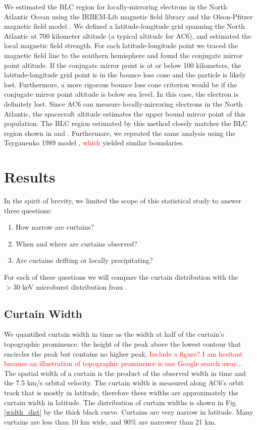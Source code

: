 \documentclass[draft]{agujournal2019}
\begin{document}
We estimated the BLC region for locally-mirroring electrons in the North Atlantic Ocean using the IRBEM-Lib magnetic field library and the Olson-Pfitzer magnetic field model \cite{irbem, Olson1982}. We defined a latitude-longitude grid spanning the North Atlantic at 700 kilometer altitude (a typical altitude for AC6), and estimated the local magnetic field strength. For each latitude-longitude point we traced the magnetic field line to the southern hemisphere and found the conjugate mirror point altitude. If the conjugate mirror point is at or below 100 kilometers, the latitude-longitude grid point is in the bounce loss cone and the particle is likely lost. Furthermore, a more rigorous bounce loss cone criterion would be if the conjugate mirror point altitude is below sea level. In this case, the electron is definitely lost. Since AC6 can measure locally-mirroring electrons in the North Atlantic, the spacecraft altitude estimates the upper bound mirror point of this population. The BLC region estimated by this method closely matches the BLC region shown in  and . Furthermore, we repeated the same analysis using the Tsyganenko 1989 model \cite{Tsyganenko1989}, \textcolor{red}{which} yielded similar boundaries.

\section{Results} \label{results}
In the spirit of brevity, we limited the scope of this statistical study to answer three questions:

\begin{enumerate}
\item How narrow are curtains?
\item When and where are curtains observed?
\item Are curtains drifting or locally precipitating?
\end{enumerate} For each of these questions we will compare the curtain distribution with the $>30$ keV microburst distribution from .

\subsection{Curtain Width}
We quantified curtain width in time as the width at half of the curtain's topographic prominence: the height of the peak above the lowest contour that encircles the peak but contains no higher peak. \textcolor{red}{Include a figure? I am hesitant because an illustration of topographic prominence is one Google search away...} The spatial width of a curtain is the product of the observed width in time and the 7.5 km/s orbital velocity. The curtain width is measured along AC6's orbit track that is mostly in latitude, therefore these widths are approximately the curtain width in latitude. The distribution of curtain widths is shown in Fig. \ref{width_dist} by the thick black curve. Curtains are very narrow in latitude. Many curtains are less than 10 km wide, and 90\% are narrower than 21 km.
	
\end{document}
